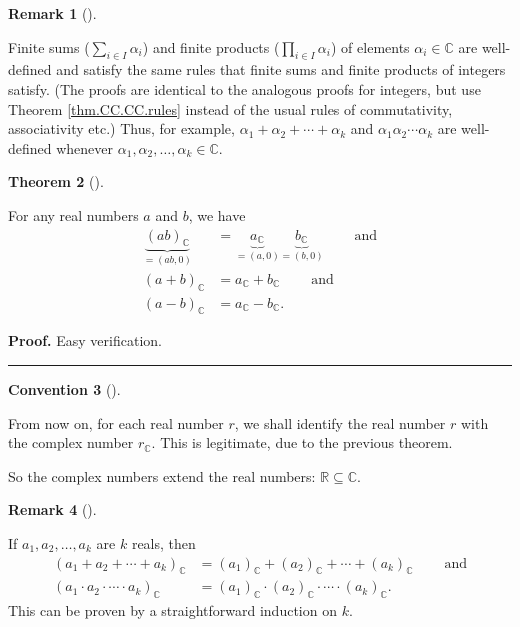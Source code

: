 \documentclass[numbers=enddot,12pt,final,onecolumn,notitlepage]{scrartcl}%
\numberwithin{exer}{subsection}
\theoremstyle{definition}
\newtheorem{theo}{Theorem}[subsection]
\newenvironment{theorem}[1][]
{\begin{theo}[#1]\begin{leftbar}}
{\end{leftbar}\end{theo}}
\newtheorem{remk}[theo]{Remark}
\newenvironment{remark}[1][]
{\begin{remk}[#1]\begin{leftbar}}
{\end{leftbar}\end{remk}}
\newtheorem{conv}[theo]{Convention}
\newenvironment{convention}[1][]
{\begin{conv}[#1]\begin{leftbar}}
{\end{leftbar}\end{conv}}
\newenvironment{proof}[1][Proof]{\noindent\textbf{#1.} }{\ \rule{0.5em}{0.5em}}
\let\sumnonlimits\sum
\let\prodnonlimits\prod
\renewcommand{\sum}{\sumnonlimits\limits}
\renewcommand{\prod}{\prodnonlimits\limits}
\begin{document}
\begin{remark}
Finite sums ($\sum_{i\in I}\alpha_{i}$) and finite products ($\prod_{i\in
I}\alpha_{i}$) of elements $\alpha_{i}\in\mathbb{C}$ are well-defined and
satisfy the same rules that finite sums and finite products of integers
satisfy. (The proofs are identical to the analogous proofs for integers, but
use Theorem \ref{thm.CC.CC.rules} instead of the usual rules of commutativity,
associativity etc.) Thus, for example, $\alpha_{1}+\alpha_{2}+\cdots
+\alpha_{k}$ and $\alpha_{1}\alpha_{2}\cdots\alpha_{k}$ are well-defined
whenever $\alpha_{1},\alpha_{2},\ldots,\alpha_{k}\in\mathbb{C}$.
\end{remark}

\begin{theorem}
For any real numbers $a$ and $b$, we have%
\begin{align*}
\underbrace{\left(  ab\right)  _{\mathbb{C}}}_{=\left(  ab,0\right)  }  &
=\underbrace{a_{\mathbb{C}}}_{=\left(  a,0\right)  }\underbrace{b_{\mathbb{C}%
}}_{=\left(  b,0\right)  }\ \ \ \ \ \ \ \ \ \ \text{and}\\
\left(  a+b\right)  _{\mathbb{C}}  & =a_{\mathbb{C}}+b_{\mathbb{C}%
}\ \ \ \ \ \ \ \ \ \ \text{and}\\
\left(  a-b\right)  _{\mathbb{C}}  & =a_{\mathbb{C}}-b_{\mathbb{C}}.
\end{align*}

\end{theorem}

\begin{proof}
Easy verification.
\end{proof}

\begin{convention}
From now on, for each real number $r$, we shall identify the real number $r$
with the complex number $r_{\mathbb{C}}$. This is legitimate, due to the
previous theorem.
\end{convention}

So the complex numbers extend the real numbers: $\mathbb{R}\subseteq
\mathbb{C}$.

\begin{remark}
If $a_{1},a_{2},\ldots,a_{k}$ are $k$ reals, then
\begin{align*}
\left(  a_{1}+a_{2}+\cdots+a_{k}\right)  _{\mathbb{C}} &  =\left(
a_{1}\right)  _{\mathbb{C}}+\left(  a_{2}\right)  _{\mathbb{C}}+\cdots+\left(
a_{k}\right)  _{\mathbb{C}}\ \ \ \ \ \ \ \ \ \ \text{and}\\
\left(  a_{1}\cdot a_{2}\cdot\cdots\cdot a_{k}\right)  _{\mathbb{C}} &
=\left(  a_{1}\right)  _{\mathbb{C}}\cdot\left(  a_{2}\right)  _{\mathbb{C}%
}\cdot\cdots\cdot\left(  a_{k}\right)  _{\mathbb{C}}.
\end{align*}
This can be proven by a straightforward induction on $k$.
\end{remark}
\end{document}
